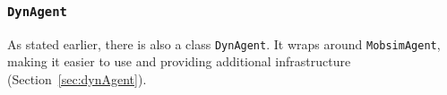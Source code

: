 
\subsubsection{\lstinline{DynAgent}}
As stated earlier, there is also a class \lstinline$DynAgent$. It wraps around  \lstinline$MobsimAgent$, making it easier to use and providing additional infrastructure (Section~\ref{sec:dynAgent}).


